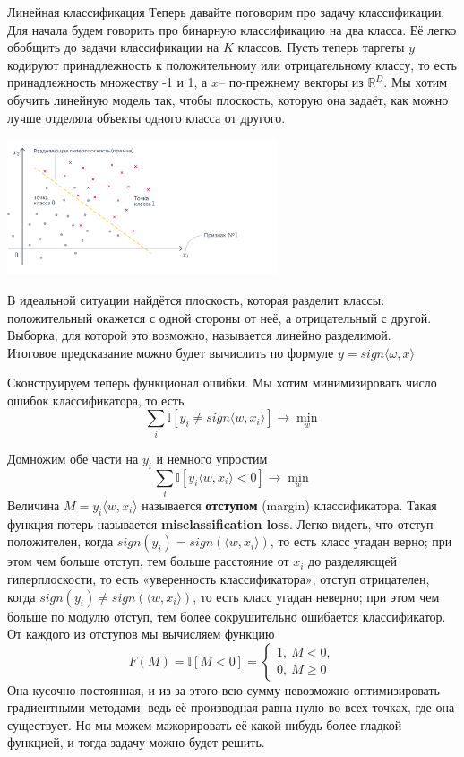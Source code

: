 Линейная классификация
Теперь давайте поговорим про задачу классификации. Для начала будем говорить про бинарную классификацию на два класса. Её легко обобщить до задачи классификации на $K$ классов. Пусть теперь таргеты $y$ кодируют принадлежность к положительному или отрицательному классу, то есть принадлежность множеству -1 и 1, а $x$– по-прежнему векторы из $\mathbb{R}^D$. Мы хотим обучить линейную модель так, чтобы плоскость, которую она задаёт, как можно лучше отделяла объекты одного класса от другого.
\begin{center}
    \includegraphics[height=4cm]{pics/t_osn24_3.png}
\end{center}
В идеальной ситуации найдётся плоскость, которая разделит классы: положительный окажется с одной стороны от неё, а отрицательный с другой. Выборка, для которой это возможно, называется линейно разделимой. \\
Итоговое предсказание можно будет вычислить по формуле $y = sign\langle\omega,x\rangle$

Сконструируем теперь функционал ошибки. Мы хотим минимизировать число ошибок классификатора, то есть $$\sum_i \mathbb{I}[y_i \neq sign \langle w, x_i\rangle]\longrightarrow \min_w$$ 

Домножим обе части на $y_i$ и немного упростим $$\sum_i \mathbb{I}[y_i \langle w, x_i\rangle < 0]\longrightarrow \min_w$$ Величина $M = y_i \langle w, x_i\rangle$ называется \textbf{отступом} (margin) классификатора. Такая функция потерь называется \textbf{misclassification loss}. Легко видеть, что отступ положителен, когда $sign(y_i) = sign(\langle w, x_i\rangle)$, то есть класс угадан верно; при этом чем больше отступ, тем больше расстояние от $x_i$ до разделяющей гиперплоскости, то есть «уверенность классификатора»; отступ отрицателен, когда $sign(y_i) \ne sign(\langle w, x_i\rangle)$, то есть класс угадан неверно; при этом чем больше по модулю отступ, тем более сокрушительно ошибается классификатор. От каждого из отступов мы вычисляем функцию $$F(M) = \mathbb{I}[M < 0] = \begin{cases}1,\ M < 0,\\ 0,\ M\geqslant 0\end{cases}$$ Она кусочно-постоянная, и из-за этого всю сумму невозможно оптимизировать градиентными методами: ведь её производная равна нулю во всех точках, где она существует. Но мы можем мажорировать её какой-нибудь более гладкой функцией, и тогда задачу можно будет решить.  \\

